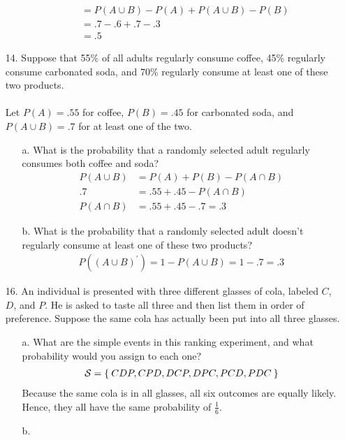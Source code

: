 \documentclass[letterpaper,12pt]{article}
\begin{document}
\begin{enumerate}
\begin{enumerate}
\begin{align*}
          &= P(A \cup B) - P(A) + P(A \cup B) - P(B) \\
          &= .7 - .6 + .7 - .3 \\
          &= .5
        \end{align*}
    \end{enumerate}
  \item[14.]
    Suppose that 55\% of all adults regularly consume coffee, 45\% regularly consume carbonated soda, and 70\% regularly consume at least one of these two products.
    \\ \\
    Let $P(A) = .55$ for coffee, $P(B) = .45$ for carbonated soda, and $P(A \cup B) = .7$ for at least one of the two.
    \begin{enumerate}
      \item[a.]
        What is the probability that a randomly selected adult regularly consumes both coffee and soda?
        \begin{align*}
          P(A \cup B) &= P(A) + P(B) - P(A \cap B) \\
          .7 &= .55 + .45 - P(A \cap B) \\
          P(A \cap B) &= .55 + .45 - .7 = .3
        \end{align*}
      \item[b.]
        What is the probability that a randomly selected adult doesn’t regularly consume at least one of these two products?
        \begin{align*}
          P((A \cup B)^\prime) = 1 - P(A \cup B) = 1 - .7 = .3
        \end{align*}
    \end{enumerate}
  \item[16.]
  An individual is presented with three different glasses of cola, labeled $C$, $D$, and $P$. He is asked to taste all three and then list them in order of preference. Suppose the same cola has actually been put into all three glasses.
  \begin{enumerate}
      \item[a.]
        What are the simple events in this ranking experiment, and what probability would you assign to each one?
        \begin{align*}
          \mathcal{S} = \Set{CDP, CPD, DCP, DPC, PCD, PDC}
        \end{align*}
        Because the same cola is in all glasses, all six outcomes are equally likely. Hence, they all have the same probability of $\frac{1}{6}$.
      \item[b.]

\end{enumerate}
\end{enumerate}
\end{document}
